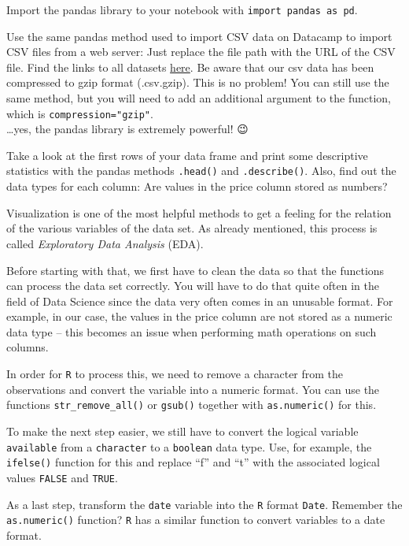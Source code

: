 \documentclass[
  11pt,
]{article}
\newenvironment{tips}[1]
  {
  \begin{itemize}
  \footnotesize
  \renewcommand{\labelitemi}{
    \raisebox{-.7\height}[0pt][0pt]{
      {\setkeys{Gin}{width=3em,keepaspectratio}
        \texttt{[image: images/\#1.png]}}
    }
  }
  \setlength{\fboxsep}{1em}
  \begin{rbox}
  \item
  }
  {
  \end{rbox}
  \end{itemize}
  }
\newenvironment{tipsp}[1]
  {
  \begin{itemize}
  \footnotesize
  \renewcommand{\labelitemi}{
    \raisebox{-.7\height}[0pt][0pt]{
      {\setkeys{Gin}{width=3em,keepaspectratio}
        \texttt{[image: images/\#1.png]}}
    }
  }
  \setlength{\fboxsep}{1em}
  \begin{pbox}
  \item
  }
  {
  \end{pbox}
  \end{itemize}
  }
\begin{document}
\begin{tipsp}p
Import the pandas library to your notebook with \texttt{import\ pandas\ as\ pd}.

Use the same pandas method used to import CSV data on Datacamp to import CSV files from a web server: Just replace the file path with the URL of the CSV file. Find the links to all datasets \href{https://docs.google.com/document/d/1nBkeJmpnoiATVw4B3DwrB45uo0TpQFE_iTisyh4p9Ro/edit?usp=sharing}{here}. Be aware that our csv data has been compressed to gzip format (.csv.gzip). This is no problem! You can still use the same method, but you will need to add an additional argument to the function, which is \texttt{compression="gzip"}.\\
\ldots yes, the pandas library is extremely powerful! 😉

Take a look at the first rows of your data frame and print some descriptive statistics with the pandas methods \texttt{.head()} and \texttt{.describe()}.
Also, find out the data types for each column: Are values in the price column stored as numbers?

\end{tipsp}

Visualization is one of the most helpful methods to get a feeling for the relation of the various variables of the data set.
As already mentioned, this process is called \emph{Exploratory Data Analysis} (EDA).

Before starting with that, we first have to clean the data so that the functions can process the data set correctly.
You will have to do that quite often in the field of Data Science since the data very often comes in an unusable format.
For example, in our case, the values in the price column are not stored as a numeric data type -- this becomes an issue when performing math operations on such columns.

\begin{tips}r
In order for \texttt{R} to process this, we need to remove a character from the observations and convert the variable into a numeric format.
You can use the functions \texttt{str\_remove\_all()} or \texttt{gsub()} together with \texttt{as.numeric()} for this.

To make the next step easier, we still have to convert the logical variable \texttt{available} from a \texttt{character} to a \texttt{boolean} data type.
Use, for example, the \texttt{ifelse()} function for this and replace ``f'' and ``t'' with the associated logical values \texttt{FALSE} and \texttt{TRUE}.

As a last step, transform the \texttt{date} variable into the \texttt{R} format \texttt{Date}.
Remember the \texttt{as.numeric()} function?
\texttt{R} has a similar function to convert variables to a date format.

\end{tips}
\end{document}
